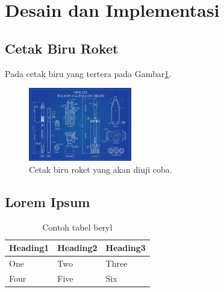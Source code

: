 \section{Desain dan Implementasi}\label{sec:desaindanimplementasi}

\subsection{Cetak Biru Roket}\label{subsec:cetakbiruroket}

Pada cetak biru yang tertera pada Gambar\ref{fig:cetakbiru}. \lipsum[8]

\begin{figure} [ht]
  \centering
  \includegraphics[width=0.4\textwidth]{gambar/cetakbiru.jpg}

  \caption{Cetak biru roket yang akan diuji coba. \cite{cetakbiruspacex}}
  \label{fig:cetakbiru}
\end{figure}

\lipsum[9-10]

\subsection{Lorem Ipsum}
\label{subsec:loremipsum}

\lipsum[11]

\begin{table}
  \caption{Contoh tabel beryl}
  \label{tab:tabelsederhana}
  \centering
  \begin{tabular}{lll}
    \toprule
    Heading1 & Heading2 & Heading3 \\
    \midrule
    One      & Two      & Three    \\
    Four     & Five     & Six      \\
    \bottomrule
  \end{tabular}
\end{table}

